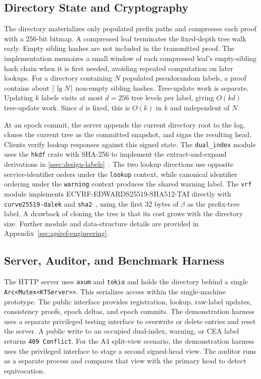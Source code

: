 \FloatBarrier
\subsection{Directory State and Cryptography}\label{ssec:impl-core-state}
\label{ssec:impl-core-crypto}

The directory materializes only populated prefix paths and compresses each proof with a 256-bit
bitmap. A compressed leaf terminates the fixed-depth tree walk early. Empty sibling hashes are
not included in the transmitted proof. The implementation memoizes a small window of each compressed
leaf's empty-sibling hash chain when it is first needed, avoiding repeated computation on later
lookups. For a directory containing $N$ populated pseudorandom labels, a proof contains about
$\lceil \lg N \rceil$ non-empty sibling hashes. Tree-update work is separate. Updating $k$ labels visits at most $d=256$
tree levels per label, giving $O(kd)$ tree-update work. Since $d$ is fixed, this is $O(k)$ in $k$
and independent of $N$.

At an epoch commit, the server appends the current directory root to the log, clones the current
tree as the committed snapshot, and signs the resulting head. Clients verify lookup responses against
this signed state. The \texttt{dual\_index} module uses the \texttt{hkdf} crate with SHA-256 to
implement the extract-and-expand derivations in \cref{ssec:design-labels}~\cite{rfc5869}.
The two lookup directions use opposite service-identifier orders under the \texttt{lookup} context,
while canonical identifier ordering under the \texttt{warning} context produces the shared warning
label. The \texttt{vrf} module implements ECVRF-EDWARDS25519-SHA512-TAI directly with
\texttt{curve25519-dalek} and \texttt{sha2}~\cite{rfc9381}, using the first 32 bytes of
$\beta$ as the prefix-tree label. A drawback of cloning the tree is that its cost grows with the
directory size. Further module and data-structure details are provided in
Appendix~\ref{sec:apiref-engineering}.

\subsection{Server, Auditor, and Benchmark Harness}\label{ssec:impl-core-server}
\label{ssec:impl-bench}

The HTTP server uses \texttt{axum} and \texttt{tokio} and holds the directory behind a single
\texttt{Arc<Mutex<KTServer>{}>}. This serializes access within the single-machine prototype. The public
interface provides registration, lookup, raw-label updates, consistency proofs, epoch deltas, and
epoch commits. The demonstration harness uses a separate privileged testing interface to overwrite or
delete entries and reset the server. A public write to an occupied dual-index, warning, or CEA label
returns \texttt{409 Conflict}. For the A4 split-view scenario, the demonstration harness uses the
privileged interface to stage a second signed-head view. The auditor runs as a separate process and
compares that view with the primary head to detect equivocation.

